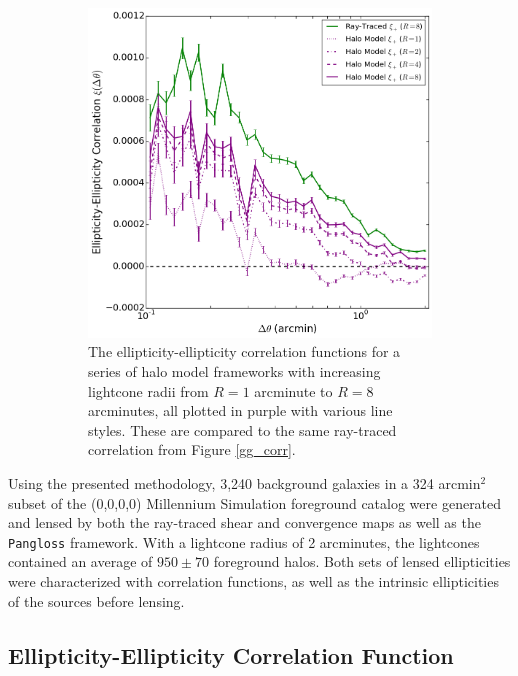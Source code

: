 \documentclass[%
 reprint,
 amsmath,amssymb,
 aps,nofootinbib
]{revtex4-1}
\begin{document}
\begin{figure}
\begin{subfigure}{0.475\textwidth}
        \includegraphics[width=\textwidth]{figs-swe/gg_corr_series.png}
        \captionsetup{justification=raggedright,singlelinecheck=false}
        \caption{The ellipticity-ellipticity correlation functions for a series of halo model frameworks with increasing lightcone radii from $R=1$ arcminute to $R=8$ arcminutes, all plotted in purple with various line styles. These are compared to the same ray-traced correlation from Figure \ref{gg_corr}.}
        \label{gg_corr_series}
    \end{subfigure}
    \caption{}
\end{figure}

Using the presented methodology, 3,240 background galaxies in a 324 arcmin$^2$ subset of the (0,0,0,0) Millennium Simulation foreground catalog were generated and lensed by both the ray-traced shear and convergence maps as well as the \texttt{Pangloss} framework. With a lightcone radius of 2 arcminutes, the lightcones contained an average of ${950\pm70}$ foreground halos. Both sets of lensed ellipticities were characterized with correlation functions, as well as the intrinsic ellipticities of the sources before lensing.

\subsection*{Ellipticity-Ellipticity Correlation Function}
\end{document}
